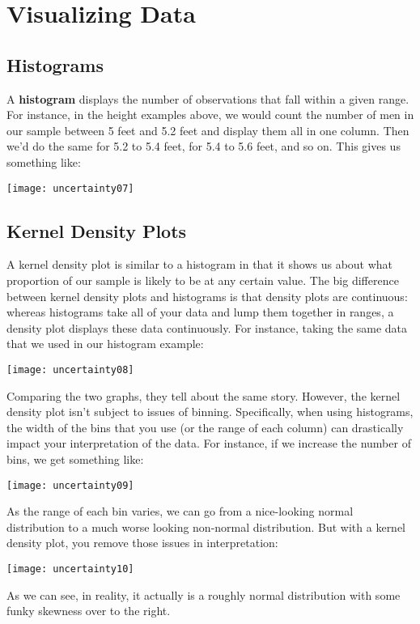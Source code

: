 \section{Visualizing Data}

\subsection{Histograms}
A \textbf{histogram} displays the number of observations that fall within a given range. For instance, in the height examples above, we would count the number of men in our sample between 5 feet and 5.2 feet and display them all in one column. Then we'd do the same for 5.2 to 5.4 feet, for 5.4 to 5.6 feet, and so on. This gives us something like:

\texttt{[image: uncertainty07]}

\subsection{Kernel Density Plots}
A kernel density plot is similar to a histogram in that it shows us about what proportion of our sample is likely to be at any certain value. The big difference between kernel density plots and histograms is that density plots are continuous: whereas histograms take all of your data and lump them together in ranges, a density plot displays these data continuously. For instance, taking the same data that we used in our histogram example:

\texttt{[image: uncertainty08]}

Comparing the two graphs, they tell about the same story. However, the kernel density plot isn't subject to issues of binning. Specifically, when using histograms, the width of the bins that you use (or the range of each column) can drastically impact your interpretation of the data. For instance, if we increase the number of bins, we get something like:

\texttt{[image: uncertainty09]}

As the range of each bin varies, we can go from a nice-looking normal distribution to a much worse looking non-normal distribution. But with a kernel density plot, you remove those issues in interpretation:

\texttt{[image: uncertainty10]}

As we can see, in reality, it actually is a roughly normal distribution with some funky skewness over to the right.

